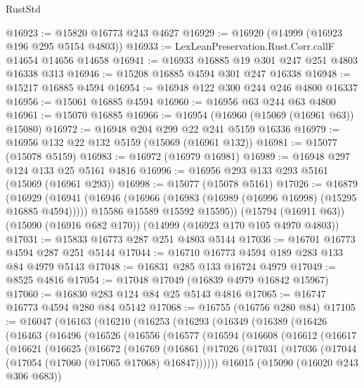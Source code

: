\begin{lexlean}{RustStd}
\begin{coremodule}
@16923 := @15820 @16773 @243 @4627
@16929 := @16920 (@14999 (@16923 @196 @295 @5154 @4803))
@16933 := LexLeanPreservation.Rust.Corr.callF @14654 @14656 @14658
@16941 := @16933 @16885 @19 @301 @247 @251 @4803 @16338 @313
@16946 := @15208 @16885 @4594 @301 @247 @16338
@16948 := @15217 @16885 @4594
@16954 := @16948 @122 @300 @244 @246 @4800 @16337
@16956 := @15061 @16885 @4594
@16960 := @16956 @63 @244 @63 @4800
@16961 := @15070 @16885
@16966 := @16954 (@16960 (@15069 (@16961 @63)) @15080)
@16972 := @16948 @204 @299 @22 @241 @5159 @16336
@16979 := @16956 @132 @22 @132 @5159 (@15069 (@16961 @132))
@16981 := @15077 (@15078 @5159)
@16983 := @16972 (@16979 @16981)
@16989 := @16948 @297 @124 @133 @25 @5161 @4816
@16996 := @16956 @293 @133 @293 @5161 (@15069 (@16961 @293))
@16998 := @15077 (@15078 @5161)
@17026 := @16879
    (@16929
      (@16941
        (@16946 (@16966 (@16983 (@16989 (@16996 @16998) (@15295 @16885 @4594)))))
        @15586
        @15589
        @15592
        @15595))
    (@15794 (@16911 @63))
    (@15090 (@16916 @682 @170))
    (@14999 (@16923 @170 @105 @4970 @4803))
@17031 := @15833 @16773 @287 @251 @4803 @5144
@17036 := @16701 @16773 @4594 @287 @251 @5144
@17044 := @16710 @16773 @4594 @189 @283 @133 @84 @4979 @5143
@17048 := @16831 @285 @133 @16724 @4979
@17049 := @8525 @4816
@17054 := @17048 @17049 (@16839 @4979 @16842 @15967)
@17060 := @16830 @283 @124 @84 @25 @5143 @4816
@17065 := @16747 @16773 @4594 @280 @84 @5142
@17068 := @16755 (@16756 @280 @84)
@17105 := @16047
    (@16163
      (@16210
        (@16253
          (@16293
            (@16349
              (@16389
                (@16426
                  (@16463
                    (@16496
                      (@16526
                        (@16556
                          (@16577
                            (@16594
                              (@16608
                                (@16612
                                  (@16617
                                    (@16621
                                      (@16625
                                        (@16672
                                          (@16769
                                            (@16861
                                              (@17026
                                                (@17031
                                                  (@17036
                                                    (@17044
                                                      (@17054 (@17060 (@17065 @17068) @16847))))))
                                              @16015
                                              (@15090 (@16020 @243 @306 @683))

\end{coremodule}
\end{lexlean}
